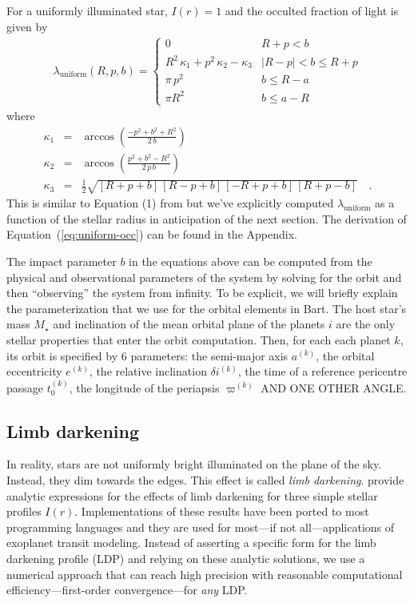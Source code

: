 \documentclass[12pt,preprint]{aastex}
\newcommand{\project}[1]{{\sffamily #1}}
\newcommand{\bart}{\project{Bart}}
\newcommand{\Eq}[1]{Equation~(\ref{eq:#1})}
\newcommand{\eq}[1]{\Eq{#1}}
\newcommand{\eqlabel}[1]{\label{eq:#1}}
\begin{document}
For a uniformly illuminated star, $I(r) = 1$ and the occulted fraction of
light is given by
\begin{eqnarray}\eqlabel{uniform-occ}
    \lambda_\mathrm{uniform} (R, p, b) = \left \{ \begin{array}{ll}
            0 & R + p < b \\
            R^2 \, \kappa_1 + p^2 \, \kappa_2 - \kappa_3
                & |R - p| < b \leq R + p \\
            \pi \, p^2 & b \leq R - a \\
            \pi R^2 & b \leq a - R
        \end{array} \right.
\end{eqnarray}
where
\begin{eqnarray}
    \kappa_1 & = & \arccos \left ( \frac{-p^2 + b^2 + R^2}{2 \, b} \right ) \\
    \kappa_2 & = & \arccos \left ( \frac{p^2 + b^2 - R^2}{2\, p \, b}
                           \right ) \\
    \kappa_3 & = & \frac{1}{2} \sqrt{[R + p + b] \, [R - p + b]
                        \, [-R + p + b] \, [R + p - b]} \quad.
\end{eqnarray}
This is similar to Equation (1) from \citet{mandel} but we've explicitly
computed $\lambda_\mathrm{uniform}$ as a function of the stellar radius in
anticipation of the next section. The derivation of \eq{uniform-occ} can be
found in the Appendix.

The impact parameter $b$ in the equations above can be computed from the
physical and observational parameters of the system by solving for the orbit
and then ``observing'' the system from infinity. To be explicit, we will
briefly explain the parameterization that we use for the orbital elements in
\bart. The host star's mass $M_\star$ and inclination of the mean orbital
plane of the planets $i$ are the only stellar properties that enter
the orbit computation. Then, for each each planet $k$, its orbit is
specified by 6 parameters: the semi-major axis $a^{(k)}$, the orbital
eccentricity $e^{(k)}$, the relative inclination $\delta i^{(k)}$, the time of
a reference pericentre passage $t_0^{(k)}$, the longitude of the periapsis
$\varpi^{(k)}$ AND ONE OTHER ANGLE.


\subsection{Limb darkening}

In reality, stars are not uniformly bright illuminated on the plane of the
sky. Instead, they dim towards the edges. This effect is called
\emph{limb darkening}. \citet{mandel} provide analytic expressions for the
effects of limb darkening for three simple stellar profiles $I(r)$.
Implementations of these results have been ported to most programming
languages and they are used for most---if not all---applications of exoplanet
transit modeling. Instead of asserting a specific form for the limb darkening
profile (LDP) and relying on these analytic solutions, we use a numerical
approach that can reach high precision with reasonable computational
efficiency---first-order convergence---for \emph{any} LDP.
\end{document}

